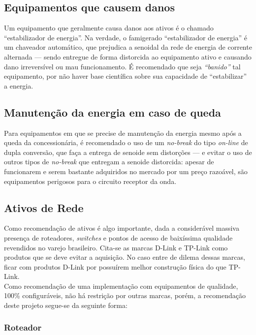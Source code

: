 \documentclass[	DIV=calc,%
							paper=a4,%
							fontsize=12pt,%
							onecolumn]{scrartcl}	 					%
\begin{document}
\subsection{Equipamentos que causem danos}

Um equipamento que geralmente causa danos aos ativos é o chamado ``estabilizador de energia''. Na verdade, o famigerado ``estabilizador de energia'' é um chaveador automático, que prejudica a senoidal da rede de energia de corrente alternada --- sendo entregue de forma distorcida ao equipamento ativo e causando dano irreversível ou mau funcionamento. É recomendado que seja \textit{``banido''} tal equipamento, por não haver base científica sobre sua capacidade de ``estabilizar'' a energia.

\subsection{Manutenção da energia em caso de queda}

Para equipamentos em que se precise de manutenção da energia mesmo após a queda da concessionária, é recomendado o uso de um \textit{no-break} do tipo \textit{on-line} de dupla conversão, que faça a entrega de senoide sem distorções --- e evitar o uso de outros tipos de \textit{no-break} que entregam a senoide distorcida: apesar de funcionarem e serem bastante adquiridos no mercado por um preço razoável, são equipamentos perigosos para o circuito receptor da onda.

\subsection{Ativos de Rede}

Como recomendação de ativos é algo importante, dada a considerável massiva presença de roteadores, \textit{switches} e pontos de acesso de baixíssima qualidade revendidos no varejo brasileiro. Cita-se as marcas D-Link e TP-Link como produtos que se deve evitar a aquisição. No caso entre de dilema dessas marcas, ficar com produtos D-Link por possuírem melhor construção física do que TP-Link. 
\\

Como recomendação de uma implementação com equipamentos de qualidade, 100\% configuráveis, não há restrição por outras marcas, porém, a recomendação deste projeto segue-se da seguinte forma:

\subsubsection{Roteador}
\end{document}

